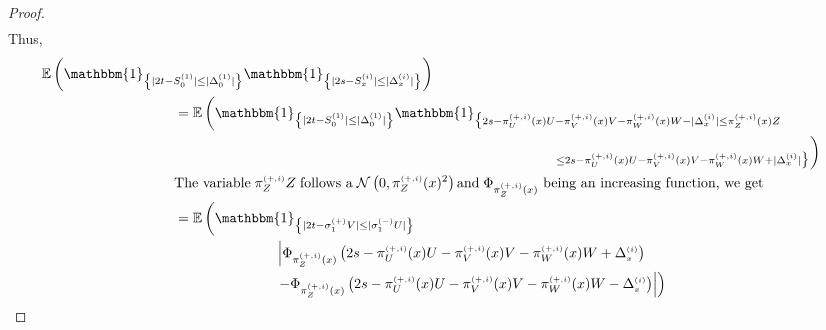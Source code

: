 \documentclass[12pt]{article}
\theoremstyle{Theorem}
\theoremstyle{definition}
\begin{document}
\begin{proof}
{\begin{align*}
\end{align*}}Thus, 
\begin{align*}
\mathbb{E}\left(\mathbbm{1}_{\left\{ |2t - S^{\scriptscriptstyle (1)}_{\scriptscriptstyle 0}| \leq |\Delta^{\scriptscriptstyle (1)}_{\scriptscriptstyle 0}|\right\}}\mathbbm{1}_{\left\{ |2s - S^{\scriptscriptstyle (i)}_{\scriptscriptstyle x}| \leq |\Delta^{\scriptscriptstyle (i)}_ {\scriptscriptstyle x}| \right\}}\right)\\
&\hspace{-6.5cm} = \mathbb{E}\left(\mathbbm{1}_{\left\{ |2t - S^{\scriptscriptstyle (1)}_{\scriptscriptstyle 0}| \leq |\Delta^{\scriptscriptstyle (1)}_{\scriptscriptstyle 0}|\right\}}\mathbbm{1}_{\big\{ 2s -  \pi^{\scriptscriptstyle(+, i)}_{U}(x)U -  \pi^{\scriptscriptstyle(+, i)}_{V}(x) V -  \pi^{\scriptscriptstyle(+, i)}_{W}(x) W  - |\Delta^{\scriptscriptstyle(i)}_ {\scriptscriptstyle x}| \leq \pi^{\scriptscriptstyle(+, i)}_{Z}(x)Z} \right.  \\  
& \hspace{3cm}\left. _{\leq 2s -  \pi^{\scriptscriptstyle(+, i)}_{U}(x)U -  \pi^{\scriptscriptstyle(+, i)}_{V}(x) V -  \pi^{\scriptscriptstyle(+, i)}_{W}(x) W + |\Delta^{\scriptscriptstyle(i)}_ {\scriptscriptstyle x}| \big\}}\right)\\
& \hspace{-6.5cm} \text{The variable}\; \pi^{\scriptscriptstyle(+, i)}_{Z}Z \; \text{follows a} \; \mathcal{N}\left(0, \pi^{\scriptscriptstyle(+, i)}_{Z}(x)^{2}\right) \text{and} \; \text{$\Phi_{\pi^{\scriptscriptstyle(+, i)}_{Z}(x)}$ being an increasing function, we get}\\
& \hspace{-6.5cm} = \mathbb{E}\left(\mathbbm{1}_{\left\{ |2t - \sigma^{\scriptscriptstyle (+)}_{1}V| \leq |\sigma^{\scriptscriptstyle (-)}_{1}U|\right\}}\right. \\
&\hspace{-4cm} \left. \left|\Phi_{ \pi^{\scriptscriptstyle(+, i)}_{Z}(x)}\left( 2s -  \pi^{\scriptscriptstyle(+, i)}_{U}(x)U -  \pi^{\scriptscriptstyle(+, i)}_{V}(x) V -  \pi^{\scriptscriptstyle(+, i)}_{W}(x) W  + \Delta^{\scriptscriptstyle(i)}_ {\scriptscriptstyle x}  \right) \right. \right.  \nonumber \\
& \hspace{-4cm}\left. \left.  - \Phi_{ \pi^{\scriptscriptstyle(+, i)}_{Z}(x)}\left( 2s -  \pi^{\scriptscriptstyle(+, i)}_{U}(x)U -  \pi^{\scriptscriptstyle(+, i)}_{V}(x) V -  \pi^{\scriptscriptstyle(+, i)}_{W}(x) W  - \Delta^{\scriptscriptstyle(i)}_ {\scriptscriptstyle x} \right)  \right| \right) \\

\end{align*}
\end{proof}
\end{document}
